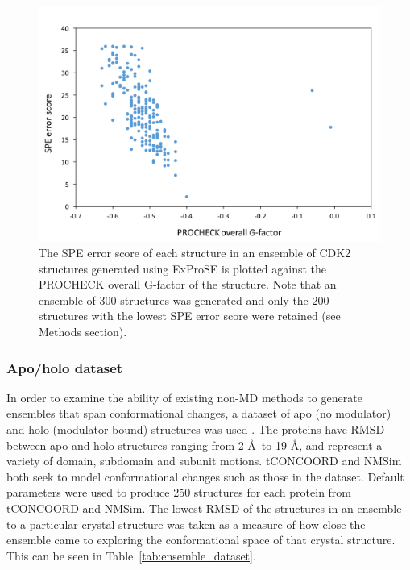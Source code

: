 \begin{figure}
\centering

\includegraphics[width=\textwidth]{figures/score_procheck/score_procheck}

\caption[SPE error score plotted against PROCHECK overall G-factor for an ExProSE ensemble]
{The SPE error score of each structure in an ensemble of CDK2 structures generated using ExProSE is plotted against the PROCHECK overall G-factor of the structure.
Note that an ensemble of 300 structures was generated and only the 200 structures with the lowest SPE error score were retained (see Methods section).}

\label{fig:score_procheck}
\end{figure}


\subsubsection{Apo/holo dataset}

In order to examine the ability of existing non-MD methods to generate ensembles that span conformational changes, a dataset of apo (no modulator) and holo (modulator bound) structures was used \cite{Atilgan2010}.
The proteins have RMSD between apo and holo structures ranging from 2 \AA\ to 19 \AA, and represent a variety of domain, subdomain and subunit motions.
tCONCOORD \cite{Seeliger2007} and NMSim \cite{Kruger2012} both seek to model conformational changes such as those in the dataset.
Default parameters were used to produce 250 structures for each protein from tCONCOORD and NMSim.
The lowest RMSD of the structures in an ensemble to a particular crystal structure was taken as a measure of how close the ensemble came to exploring the conformational space of that crystal structure.
This can be seen in Table~\ref{tab:ensemble_dataset}.


